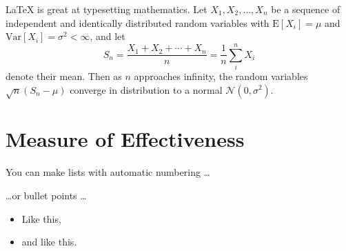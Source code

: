 \documentclass[paper=a4, fontsize=11pt,twoside]{scrartcl}	%
\begin{document}
\LaTeX{} is great at typesetting mathematics. Let $X_1, X_2, \ldots, X_n$ be a sequence of independent and identically distributed random variables with $\text{E}[X_i] = \mu$ and $\text{Var}[X_i] = \sigma^2 < \infty$, and let
$$S_n = \frac{X_1 + X_2 + \cdots + X_n}{n}
      = \frac{1}{n}\sum_{i}^{n} X_i$$
denote their mean. Then as $n$ approaches infinity, the random variables $\sqrt{n}(S_n - \mu)$ converge in distribution to a normal $\mathcal{N}(0, \sigma^2)$.

\section{Measure of Effectiveness}

You can make lists with automatic numbering \dots

\dots or bullet points \dots
\begin{itemize}
\item Like this,
\item and like this.
\end{itemize}




\end{document}
